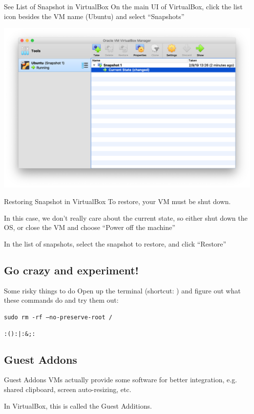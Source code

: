 \documentclass[12pt]{beamer}
\begin{document}
\begin{frame}{See List of Snapshot in VirtualBox}
  On the main UI of VirtualBox, click the list icon besides the VM name (Ubuntu) and select ``Snapshots''
  \begin{center}
    \includegraphics[width=0.8\linewidth]{vb-snapshots}
  \end{center}
\end{frame}

\begin{frame}{Restoring Snapshot in VirtualBox}
  To restore, your VM must be shut down.

  In this case, we don't really care about the current state, so either shut down the OS, or close the VM and choose ``Power off the machine''

  In the list of snapshots, select the snapshot to restore, and click ``Restore''
\end{frame}

\subsection{Go crazy and experiment!}
\begin{frame}[fragile]{Some risky things to do}
  Open up the terminal (shortcut: ) and figure out what these commands do and try them out:

  \texttt{sudo rm -rf --no-preserve-root /}

  \texttt{:(){:|:&};:}
\end{frame}

\subsection{Guest Addons}
\begin{frame}{Guest Addons}
  VMs actually provide some software for better integration, e.g. shared clipboard, screen auto-resizing, etc.

  In VirtualBox, this is called the Guest Additions.
\end{frame}
\end{document}
